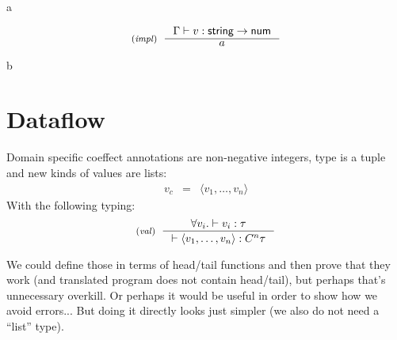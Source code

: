 a

\begin{equation*}
\tyrule{impl}
  { \Gamma \vdash v : \ident{string} \rightarrow \ident{num}}
  { a }
\end{equation*}

b



%




%

\section{Dataflow}
Domain specific coeffect annotations are non-negative integers, type is a tuple and new kinds
of values are lists:
\begin{equation*}
\begin{array}{rcl}
  v_c &  = &  \langle v_1, \ldots, v_n \rangle
\end{array}
\end{equation*}
%
With the following typing:
%
\begin{equation*}  
\tyrule{val}
  { \forall v_i . \vdash v_i : \tau }
  { \vdash \langle v_1, \ldots, v_n \rangle : \ctyp{n}{\tau} }
\end{equation*}
%


We could define those in terms of head/tail functions and then prove that they work (and translated
program does not contain head/tail), but perhaps that's unnecessary overkill. Or perhaps it would
be useful in order to show how we avoid errors... But doing it directly looks just simpler (we
also do not need a ``list'' type).

